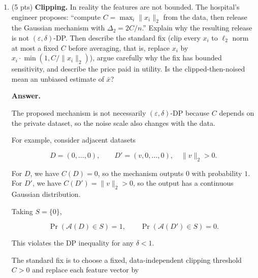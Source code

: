 \documentclass[11pt]{article}
\newcommand{\cA}{\mathcal{A}}
\newcommand{\eps}{\varepsilon}
\newenvironment{answer}{\par\medskip\noindent\textbf{Answer.}\ }{\par\bigskip}
\begin{document}
\begin{enumerate}
\begin{answer}
Therefore,

\[
\begin{aligned}
\frac{E_{\mathrm{Lap}}}{E_{\mathrm{Gauss}}}
&=\frac{8d^2/(n^2\eps^2)}
{8d\ln(1.25/\delta)/(n^2\eps^2)}\\
&=\boxed{\frac{d}{\ln(1.25/\delta)}}.
\end{aligned}
\]

For $d=100$ and $\delta=10^{-5}$,

\[
\frac{E_{\mathrm{Lap}}}{E_{\mathrm{Gauss}}}
=\frac{100}{\ln(125000)}
\approx 8.52.
\]

By choosing Gaussian over Laplace, the
hospital accepts a small nonzero $\delta$
(approximate DP instead of pure DP) in
exchange for substantially lower noise
and better utility.

\end{answer}

\item (5 pts) \textbf{Clipping.} In reality the features are not bounded. The
hospital's engineer proposes: ``compute $C=\max_i\|x_i\|_2$ from the data,
then release the Gaussian mechanism with $\Delta_2=2C/n$.'' Explain why the
resulting release is not $(\eps,\delta)$-DP. Then describe the standard fix
(clip every $x_i$ to $\ell_2$ norm at most a fixed $C$ before averaging, that
is, replace $x_i$ by $x_i\cdot\min(1,C/\|x_i\|_2)$), argue carefully why the
fix has bounded sensitivity, and describe the price paid in utility. Is the
clipped-then-noised mean an unbiased estimate of $\bar{x}$?

\begin{answer}

The proposed mechanism is not necessarily
$(\eps,\delta)$-DP because $C$ depends on
the private dataset, so the noise scale
also changes with the data.

For example, consider adjacent datasets

\[
D=(0,\ldots,0),\qquad
D'=(v,0,\ldots,0),
\quad \|v\|_2>0.
\]

For $D$, we have $C(D)=0$, so the mechanism
outputs $0$ with probability $1$.
For $D'$, we have $C(D')=\|v\|_2>0$,
so the output has a continuous Gaussian
distribution.

Taking $S=\{0\}$,

\[
\Pr(\cA(D)\in S)=1,
\qquad
\Pr(\cA(D')\in S)=0.
\]

This violates the DP inequality for
any $\delta<1$.

The standard fix is to choose a fixed,
data-independent clipping threshold $C>0$
and replace each feature vector by


\end{answer}
\end{enumerate}
\end{document}
